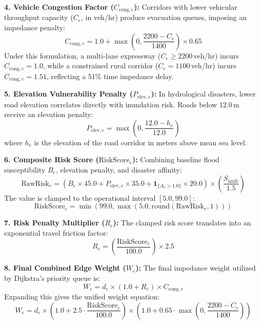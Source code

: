 \documentclass[12pt,oneside]{report}
\begin{document}
\textbf{4. Vehicle Congestion Factor ($C_{\text{cong}, e}$):} Corridors with lower vehicular throughput capacity ($C_e$, in veh/hr) produce evacuation queues, imposing an impedance penalty:
\begin{equation}
    C_{\text{cong}, e} = 1.0 + \max\left(0, \frac{2200 - C_e}{1400}\right) \times 0.65
\end{equation}
Under this formulation, a multi-lane expressway ($C_e \ge 2200$\,veh/hr) incurs $C_{\text{cong}, e} = 1.0$, while a constrained rural corridor ($C_e = 1100$\,veh/hr) incurs $C_{\text{cong}, e} = 1.51$, reflecting a 51\% time impedance delay.

\textbf{5. Elevation Vulnerability Penalty ($P_{\text{elev}, e}$):} In hydrological disasters, lower road elevation correlates directly with inundation risk. Roads below $12.0$\,m receive an elevation penalty:
\begin{equation}
    P_{\text{elev}, e} = \max\left(0, \frac{12.0 - h_e}{12.0}\right)
\end{equation}
where $h_e$ is the elevation of the road corridor in meters above mean sea level.

\textbf{6. Composite Risk Score ($\text{RiskScore}_e$):} Combining baseline flood susceptibility $B_e$, elevation penalty, and disaster affinity:
\begin{equation}
    \text{RawRisk}_e = \left( B_e \times 45.0 + P_{\text{elev}, e} \times 35.0 + \mathbf{1}_{\{A_e > 1.0\}} \times 20.0 \right) \times \left(\frac{S_{\text{mult}}}{1.5}\right)
\end{equation}
The value is clamped to the operational interval $[5.0, 99.0]$:
\begin{equation}
    \text{RiskScore}_e = \min\left(99.0, \max\left(5.0, \text{round}(\text{RawRisk}_e, 1)\right)\right)
\end{equation}

\textbf{7. Risk Penalty Multiplier ($R_e$):} The clamped risk score translates into an exponential travel friction factor:
\begin{equation}
    R_e = \left(\frac{\text{RiskScore}_e}{100.0}\right) \times 2.5
\end{equation}

\textbf{8. Final Combined Edge Weight ($W_e$):} The final impedance weight utilized by Dijkstra's priority queue is:
\begin{equation}
    W_e = d_e \times (1.0 + R_e) \times C_{\text{cong}, e}
\end{equation}
Expanding this gives the unified weight equation:
\begin{equation}
    \boxed{W_e = d_e \times \left(1.0 + 2.5 \cdot \frac{\text{RiskScore}_e}{100.0}\right) \times \left(1.0 + 0.65 \cdot \max\left(0, \frac{2200 - C_e}{1400}\right)\right)}
\end{equation}
\end{document}
